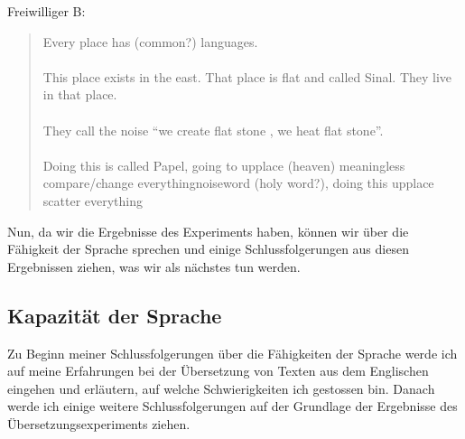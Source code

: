 \documentclass{article}
\begin{document}
\newpage
\noindent
Freiwilliger B:
\begin{quotation}
    \noindent
    Every place has (common?) languages.
    \\
    \\
    \noindent
    This place exists in the east. That place is flat and called Sinal. They live in that place.
    \\
    \\
    \noindent
    They call the noise ``we create flat stone , we heat flat stone''.
    \\
    \\
    \noindent
    Doing this is called Papel, going to upplace (heaven) meaningless
    compare/change everythingnoiseword (holy word?), doing this upplace scatter everything
\end{quotation}

Nun, da wir die Ergebnisse des Experiments haben, können wir über die Fähigkeit der Sprache sprechen
und einige Schlussfolgerungen aus diesen Ergebnissen ziehen, was wir als nächstes tun werden.

\subsection{Kapazität der Sprache}
Zu Beginn meiner Schlussfolgerungen über die Fähigkeiten der Sprache werde ich auf meine Erfahrungen
bei der Übersetzung von Texten aus dem Englischen eingehen und erläutern, auf welche Schwierigkeiten
ich gestossen bin. Danach werde ich einige weitere Schlussfolgerungen auf der Grundlage der Ergebnisse
des Übersetzungsexperiments ziehen.
\end{document}
